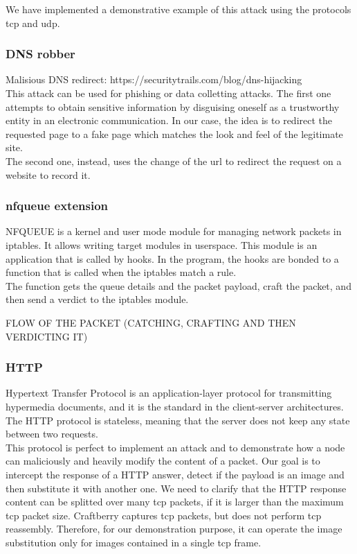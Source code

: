 \documentclass[12pt]{article}
\begin{document}
	We have implemented a demonstrative example of this attack using the protocols tcp and udp.\\

	\subsubsection{DNS robber}

	Malisious DNS redirect: https://securitytrails.com/blog/dns-hijacking\\

	This attack can be used for phishing or data colletting attacks. The first one attempts to obtain sensitive information by disguising oneself as a trustworthy entity in an electronic communication. In our case, the idea is to redirect the requested page to a fake page which matches the look and feel of the legitimate site.\\
	The second one, instead, uses the change of the url to redirect the request on a website to record it.


	\subsubsection{nfqueue extension}
	NFQUEUE is a kernel and user mode module for managing network packets in iptables. It allows writing  target modules in userspace. This module is an application that is called by  hooks. In the program, the hooks are bonded to a function that is called when the iptables match a rule.\\
	The function gets the queue details and the packet payload, craft the packet, and then send a verdict to the iptables module. 

	FLOW OF THE PACKET (CATCHING, CRAFTING AND THEN VERDICTING IT)\\

	\subsubsection{HTTP}

	Hypertext Transfer Protocol is an application-layer protocol for transmitting hypermedia documents, and it is the standard in the client-server architectures. The HTTP protocol is stateless, meaning that the server does not keep any state between two requests.\\
	This protocol is perfect to implement an attack and to demonstrate how a node can maliciously and heavily modify the content of a packet. Our goal is to intercept the response of a HTTP answer, detect if the payload is an image and then substitute it with another one. We need to clarify that the HTTP response content can be splitted over many tcp packets, if it is larger than the maximum tcp packet size. Craftberry captures tcp packets, but does not perform tcp reassembly. Therefore, for our demonstration purpose, it can operate the image substitution only for images contained in a single tcp frame.
\end{document}
